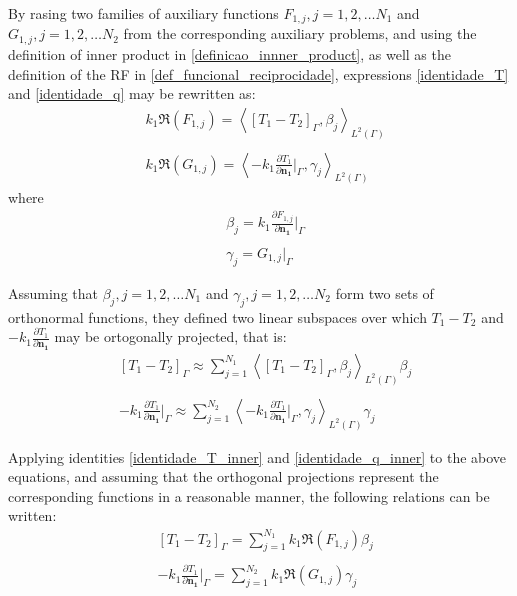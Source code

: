 \documentclass[12pt]{CHT-20}
\begin{document}
By rasing two families of auxiliary functions $F_{1,j}, j=1,2,\ldots N_1$ and $G_{1,j}, j=1,2,\ldots N_2$ from the corresponding auxiliary problems, and using the definition of inner product in \eqref{definicao_innner_product}, as well as the definition of the RF in \eqref{def_funcional_reciprocidade}, expressions \eqref{identidade_T} and \eqref{identidade_q} may be rewritten as:
\begin{align}
& k_1 \Re(F_{1,j})
=
\left\langle \left[T_1 - T_2\right]_\Gamma, \beta_j\right\rangle _{L^2(\Gamma)}
\label{identidade_T_inner} \\ \nonumber \\
& k_1 \Re(G_{1,j})
=
\left\langle  -k_1 \frac{\partial T_1}{\partial\mathbf{n_1}}\bigg|_\Gamma, \gamma_j\right\rangle _{L^2(\Gamma)}
\label{identidade_q_inner}
\end{align}
where
\begin{align}
& \beta_j = k_1 \frac{\partial F_{1,j}}{\partial\mathbf{n_1}}\bigg|_\Gamma \label{expressao_define_beta} \\ \nonumber \\
& \gamma_j = G_{1,j}\big|_\Gamma \label{expressao_define_gamma}
\end{align}

Assuming that $\beta_j, j=1,2,\ldots N_1$ and $\gamma_j, j=1,2,\ldots N_2$ form two sets of orthonormal functions, they defined two linear subspaces over which $T_1 - T_2$ and $-k_1 \frac{\partial T_1}{\partial\mathbf{n_1}}$ may be ortogonally projected, that is:
\begin{align}
& [T_1 - T_2]_\Gamma \approx \sum_{j=1}^{N_1} \left\langle  \left[T_1 - T_2\right]_\Gamma, \beta_j \right\rangle_{L^2(\Gamma)} \beta_j \\ \nonumber \\
& - k_1 \frac{\partial T_1}{\partial\mathbf{n_1}}\bigg|_\Gamma \approx \sum_{j=1}^{N_2} \left\langle  -k_1 \frac{\partial T_1}{\partial\mathbf{n_1}}\bigg|_\Gamma, \gamma_j \right\rangle_{L^2(\Gamma)} \gamma_j
\end{align}

Applying identities \eqref{identidade_T_inner} and \eqref{identidade_q_inner} to the above equations, and assuming that the orthogonal projections represent the corresponding functions in a reasonable manner, the following relations can be written:
\begin{align}
& [T_1 - T_2]_\Gamma = \sum_{j=1}^{N_1} k_1 \Re(F_{1,j}) \beta_j \label{resultado_1} \\ \nonumber \\
& - k_1 \frac{\partial T_1}{\partial\mathbf{n_1}}\bigg|_\Gamma = \sum_{j=1}^{N_2} k_1 \Re(G_{1,j}) \gamma_j \label{resultado_2}
\end{align}
\end{document}
